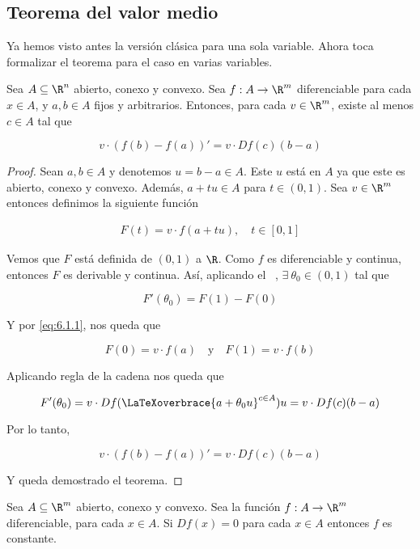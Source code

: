 \subsection{Teorema del valor medio}

Ya hemos visto antes la versión clásica para una sola variable. Ahora toca formalizar el teorema para el caso en varias variables.

\begin{teo}
    Sea $A \subseteq \R^n$ abierto, conexo y convexo. Sea $f: A \rightarrow \R^m$ diferenciable para cada $x \in A$, y $a,b \in A$ fijos y arbitrarios. Entonces, para cada $v \in \R^m$, existe al menos $c \in A$ tal que
    
    \[
    v \cdot \left( f(b) - f(a) \right)' = v \cdot Df(c)(b - a)
    \]
\end{teo}

\begin{proof}
    Sean $a, b \in A$ y denotemos $u = b - a \in A$. Este $u$ está en $A$ ya que este es abierto, conexo y convexo. Además, $a + tu \in A$ para $t \in (0,1)$. Sea $v \in \R^m$ entonces definimos la siguiente función
    
    \begin{align}\label{eq:6.1.1}
        F(t) = v \cdot f(a + tu), \quad t \in [0,1]
    \end{align}
    
    Vemos que $F$ está definida de $(0,1)$ a $\R$. Como $f$ es diferenciable y continua, entonces $F$ es derivable y continua. Así, aplicando el \TVM~, $\exists~\theta_0 \in (0,1)$ tal que
    
    \[
    F'(\theta_0) = F(1) - F(0)
    \]
    
    Y por \ref{eq:6.1.1}, nos queda que
    
    \[
    F(0) = v \cdot f(a) \quad \text{y} \quad F(1) = v \cdot f(b)
    \]
    
    Aplicando regla de la cadena nos queda que
    
    \[
    F'(\theta_0) = v \cdot Df(\LaTeXoverbrace{a + \theta_0u}^{c \in A})u = v \cdot Df(c)(b-a)
    \]
    
    Por lo tanto,
    
    \[
    v \cdot \left( f(b) - f(a) \right)' = v \cdot Df(c)(b - a)
    \]
    
    Y queda demostrado el teorema.
\end{proof}

\begin{cor}
    Sea $A \subseteq \R^m$ abierto, conexo y convexo. Sea la función $f: A \rightarrow \R^m$ diferenciable, para cada $x \in A$. Si $Df(x) = 0$ para cada $x \in A$ entonces $f$ es constante.
\end{cor}

